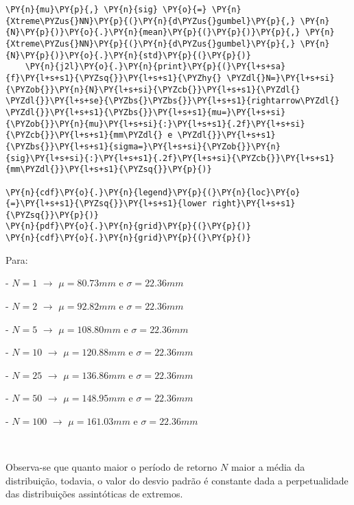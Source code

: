 \begin{tcolorbox}[breakable, size=fbox, boxrule=1pt, pad at break*=1mm,colback=cellbackground, colframe=cellborder]
\begin{Verbatim}[commandchars=\\\{\}]
    \PY{n}{mu}\PY{p}{,} \PY{n}{sig} \PY{o}{=} \PY{n}{Xtreme\PYZus{}NN}\PY{p}{(}\PY{n}{d\PYZus{}gumbel}\PY{p}{,} \PY{n}{N}\PY{p}{)}\PY{o}{.}\PY{n}{mean}\PY{p}{(}\PY{p}{)}\PY{p}{,} \PY{n}{Xtreme\PYZus{}NN}\PY{p}{(}\PY{n}{d\PYZus{}gumbel}\PY{p}{,} \PY{n}{N}\PY{p}{)}\PY{o}{.}\PY{n}{std}\PY{p}{(}\PY{p}{)}
    \PY{n}{j2l}\PY{o}{.}\PY{n}{print}\PY{p}{(}\PY{l+s+sa}{f}\PY{l+s+s1}{\PYZsq{}}\PY{l+s+s1}{\PYZhy{} \PYZdl{}N=}\PY{l+s+si}{\PYZob{}}\PY{n}{N}\PY{l+s+si}{\PYZcb{}}\PY{l+s+s1}{\PYZdl{} \PYZdl{}}\PY{l+s+se}{\PYZbs{}\PYZbs{}}\PY{l+s+s1}{rightarrow\PYZdl{} \PYZdl{}}\PY{l+s+s1}{\PYZbs{}}\PY{l+s+s1}{mu=}\PY{l+s+si}{\PYZob{}}\PY{n}{mu}\PY{l+s+si}{:}\PY{l+s+s1}{.2f}\PY{l+s+si}{\PYZcb{}}\PY{l+s+s1}{mm\PYZdl{} e \PYZdl{}}\PY{l+s+s1}{\PYZbs{}}\PY{l+s+s1}{sigma=}\PY{l+s+si}{\PYZob{}}\PY{n}{sig}\PY{l+s+si}{:}\PY{l+s+s1}{.2f}\PY{l+s+si}{\PYZcb{}}\PY{l+s+s1}{mm\PYZdl{}}\PY{l+s+s1}{\PYZsq{}}\PY{p}{)}

\PY{n}{cdf}\PY{o}{.}\PY{n}{legend}\PY{p}{(}\PY{n}{loc}\PY{o}{=}\PY{l+s+s1}{\PYZsq{}}\PY{l+s+s1}{lower right}\PY{l+s+s1}{\PYZsq{}}\PY{p}{)}
\PY{n}{pdf}\PY{o}{.}\PY{n}{grid}\PY{p}{(}\PY{p}{)}
\PY{n}{cdf}\PY{o}{.}\PY{n}{grid}\PY{p}{(}\PY{p}{)}
\end{Verbatim}
\end{tcolorbox}

    Para:

    
    - $N=1$ $\rightarrow$ $\mu=80.73mm$ e $\sigma=22.36mm$

    
    - $N=2$ $\rightarrow$ $\mu=92.82mm$ e $\sigma=22.36mm$

    
    - $N=5$ $\rightarrow$ $\mu=108.80mm$ e $\sigma=22.36mm$

    
    - $N=10$ $\rightarrow$ $\mu=120.88mm$ e $\sigma=22.36mm$

    
    - $N=25$ $\rightarrow$ $\mu=136.86mm$ e $\sigma=22.36mm$

    
    - $N=50$ $\rightarrow$ $\mu=148.95mm$ e $\sigma=22.36mm$

    
    - $N=100$ $\rightarrow$ $\mu=161.03mm$ e $\sigma=22.36mm$

    
    \begin{center}
    \end{center}
    { \hspace*{\fill} \\}
    
    Observa-se que quanto maior o período de retorno \(N\) maior a média da
distribuição, todavia, o valor do desvio padrão é constante dada a
perpetualidade das distribuições assintóticas de extremos.

